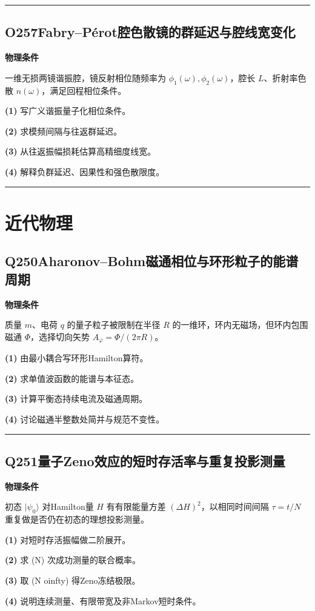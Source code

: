 \documentclass[UTF8,a4paper,11pt,oneside,openany]{ctexbook}
\begin{document}
\par\bigskip\hrule\bigskip
\section*{O257\quad Fabry–Pérot腔色散镜的群延迟与腔线宽变化}
\textbf{物理条件}\par 一维无损两镜谐振腔，镜反射相位随频率为 \(\phi_1(\omega),\phi_2(\omega)\)，腔长 \(L\)、折射率色散 \(n(\omega)\)，满足回程相位条件。
\par\noindent\textbf{(1)} 写广义谐振量子化相位条件。
\par\noindent\textbf{(2)} 求模频间隔与往返群延迟。
\par\noindent\textbf{(3)} 从往返振幅损耗估算高精细度线宽。
\par\noindent\textbf{(4)} 解释负群延迟、因果性和强色散限度。

\par\bigskip\hrule\bigskip
\chapter{近代物理}
\section*{Q250\quad Aharonov–Bohm磁通相位与环形粒子的能谱周期}
\textbf{物理条件}\par 质量 \(m\)、电荷 \(q\) 的量子粒子被限制在半径 \(R\) 的一维环，环内无磁场，但环内包围磁通 \(\Phi\)，选择切向矢势 \(A_\varphi=\Phi/(2\pi R)\)。
\par\noindent\textbf{(1)} 由最小耦合写环形Hamilton算符。
\par\noindent\textbf{(2)} 求单值波函数的能谱与本征态。
\par\noindent\textbf{(3)} 计算平衡态持续电流及磁通周期。
\par\noindent\textbf{(4)} 讨论磁通半整数处简并与规范不变性。

\par\bigskip\hrule\bigskip
\section*{Q251\quad 量子Zeno效应的短时存活率与重复投影测量}
\textbf{物理条件}\par 初态 \(|\psi_0\rangle\) 对Hamilton量 \(H\) 有有限能量方差 \((\Delta H)^2\)，以相同时间间隔 \(\tau=t/N\) 重复做是否仍在初态的理想投影测量。
\par\noindent\textbf{(1)} 对短时存活振幅做二阶展开。
\par\noindent\textbf{(2)} 求 (N) 次成功测量的联合概率。
\par\noindent\textbf{(3)} 取 (N	oinfty) 得Zeno冻结极限。
\par\noindent\textbf{(4)} 说明连续测量、有限带宽及非Markov短时条件。
\end{document}
